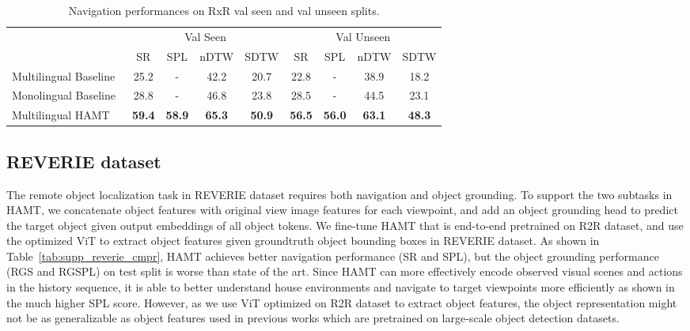 \begin{table}
\centering
\small
\caption{Navigation performances on RxR val seen and val unseen splits.}
\label{tab:supp_rxr_val_cmpr}
\begin{tabular}{lcccccccc} \toprule
 & \multicolumn{4}{c}{Val Seen} & \multicolumn{4}{c}{Val Unseen} \\
 & SR & SPL & nDTW & SDTW & SR & SPL & nDTW & SDTW \\ \midrule
Multilingual Baseline~\cite{ku2020room} & 25.2 & - & 42.2 & 20.7 & 22.8 & - & 38.9 & 18.2 \\
Monolingual Baseline~\cite{ku2020room} & 28.8 & - & 46.8 & 23.8 & 28.5 & - & 44.5 & 23.1 \\ \midrule
Multilingual HAMT & \textbf{59.4} & \textbf{58.9} & \textbf{65.3} & \textbf{50.9}  & \textbf{56.5} & \textbf{56.0} & \textbf{63.1} & \textbf{48.3} \\ \bottomrule
\end{tabular}
\end{table}


\subsection{REVERIE dataset}
The remote object localization task in REVERIE dataset requires both navigation and object grounding. To support the two subtasks in HAMT, we concatenate object features with original view image features for each viewpoint, and add an object grounding head to predict the target object given output embeddings of all object tokens.
We fine-tune HAMT that is end-to-end pretrained on R2R dataset, and use the optimized ViT to extract object features given groundtruth object bounding boxes in REVERIE dataset.
As shown in Table~\ref{tab:supp_reverie_cmpr}, HAMT achieves better navigation performance (SR and SPL), but the object grounding performance (RGS and RGSPL) on test split is worse than state of the art. 
Since HAMT can more effectively encode observed visual scenes and actions in the history sequence, it is able to better understand house environments and navigate to target viewpoints more efficiently as shown in the much higher SPL score.
However, as we use ViT optimized on R2R dataset to extract object features, the object representation might not be as generalizable as object features used in previous works which are pretrained on large-scale object detection datasets.


